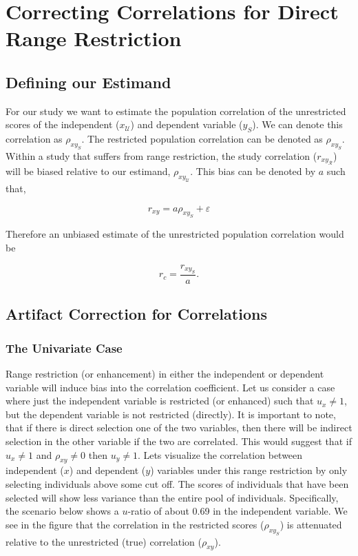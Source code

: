 \documentclass[
  letterpaper,
  DIV=11,
  numbers=noendperiod]{scrreprt}
\begin{document}
\hypertarget{correcting-correlations-for-direct-range-restriction}{%
\section{Correcting Correlations for Direct Range
Restriction}\label{correcting-correlations-for-direct-range-restriction}}

\hypertarget{defining-our-estimand-7}{%
\subsection{Defining our Estimand}\label{defining-our-estimand-7}}

For our study we want to estimate the population correlation of the
unrestricted scores of the independent (\(x_\mathcal{U}\)) and dependent
variable (\(y_S\)). We can denote this correlation as \(\rho_{xy_S}\).
The restricted population correlation can be denoted as \(\rho_{xy_S}\).
Within a study that suffers from range restriction, the study
correlation (\(r_{xy_{\mathcal{R}}}\)) will be biased relative to our
estimand, \(\rho_{xy_{\mathcal{U}}}\). This bias can be denoted by \(a\)
such that,

\[
r_{xy} = a \rho_{xy_S} + \varepsilon  
\]

Therefore an unbiased estimate of the unrestricted population
correlation would be

\[
r_c = \frac{ r_{xy_S} }{ a}.
\]

\hypertarget{artifact-correction-for-correlations}{%
\subsection{Artifact Correction for
Correlations}\label{artifact-correction-for-correlations}}

\hypertarget{the-univariate-case-1}{%
\subsubsection*{The Univariate Case}\label{the-univariate-case-1}}

Range restriction (or enhancement) in either the independent or
dependent variable will induce bias into the correlation coefficient.
Let us consider a case where just the independent variable is restricted
(or enhanced) such that \(u_x\neq 1\), but the dependent variable is not
restricted (directly). It is important to note, that if there is direct
selection one of the two variables, then there will be indirect
selection in the other variable if the two are correlated. This would
suggest that if \(u_x\neq 1\) and \(\rho_{xy}\neq 0\) then
\(u_y\neq 1\). Lets visualize the correlation between independent
(\(x\)) and dependent (\(y\)) variables under this range restriction by
only selecting individuals above some cut off. The scores of individuals
that have been selected will show less variance than the entire pool of
individuals. Specifically, the scenario below shows a \(u\)-ratio of
about 0.69 in the independent variable. We see in the figure that the
correlation in the restricted scores (\(\rho_{xy_S}\)) is attenuated
relative to the unrestricted (true) correlation (\(\rho_{xy}\)).
\end{document}
